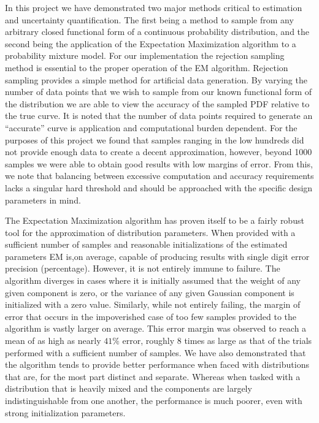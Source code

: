 \documentclass[12pt]{article}
\begin{document}
In this project we have demonstrated two major methods critical to estimation and uncertainty quantification. The first being a method to sample from any arbitrary closed functional form of a continuous probability distribution, and the second being the application of the Expectation Maximization algorithm to a probability mixture model. For our implementation the rejection sampling method is essential to the proper operation of the EM algorithm. Rejection sampling provides a simple method for artificial data generation. By varying the number of data points that we wish to sample from our known functional form of the distribution we are able to view the accuracy of the sampled PDF relative to the true curve. It is noted that the number of data points required to generate an ``accurate'' curve is application and computational burden dependent. For the purposes of this project we found that samples ranging in the low hundreds did not provide enough data to create a decent approximation, however, beyond 1000 samples we were able to obtain good results with low margins of error. From this, we note that balancing between excessive computation and accuracy requirements lacks a singular hard threshold and should be approached with the specific design parameters in mind.

The Expectation Maximization algorithm has proven itself to be a fairly robust tool for the approximation of distribution parameters. When provided with a sufficient number of samples and reasonable initializations of the estimated parameters EM is,on average, capable of producing results with single digit error precision (percentage).  However, it is not entirely immune to failure. The algorithm diverges in cases where it is initially assumed that the weight of any given component is zero, or the variance of any given Gaussian component is initialized with a zero value. Similarly, while not entirely failing, the margin of error that occurs in the impoverished case of too few samples provided to the algorithm is vastly larger on average. This error margin was observed to reach a mean of as high as nearly $41\%$ error, roughly 8 times as large as that of the trials performed with a sufficient number of samples. We have also demonstrated that the algorithm tends to provide better performance when faced with distributions that are, for the most part distinct and separate. Whereas when tasked with a distribution that is heavily mixed and the components are largely indistinguishable from one another, the performance is much poorer, even with strong initialization parameters.
\end{document}
